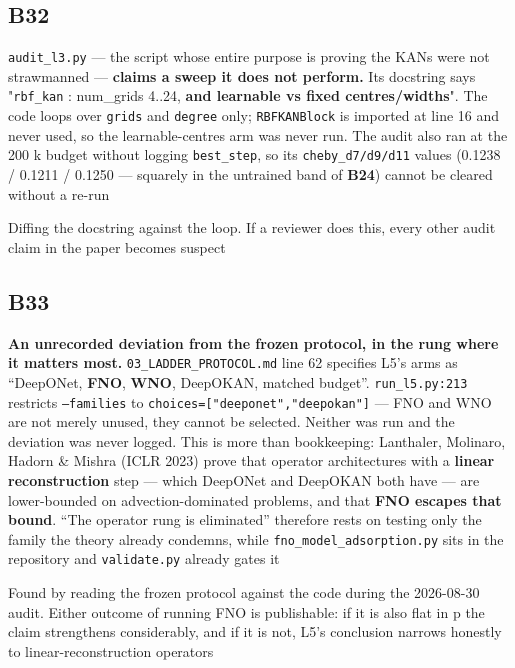 \documentclass[10pt]{article}
\begin{document}
\subsection*{B32}\label{led:B32}
\begin{description}[leftmargin=0pt,itemsep=1pt]
\item[Defect.] \texttt{audit\_l3.py} --- the script whose entire purpose is proving the KANs were not strawmanned --- \textbf{claims a sweep it does not perform.} Its docstring says "\texttt{rbf\_kan} : num\_grids 4..24, \textbf{and learnable vs fixed centres/widths}". The code loops over \texttt{grids} and \texttt{degree} only; \texttt{RBFKANBlock} is imported at line 16 and never used, so the learnable-centres arm was never run. The audit also ran at the 200 k budget without logging \texttt{best\_step}, so its \texttt{cheby\_d7/d9/d11} values (0.1238 / 0.1211 / 0.1250 --- squarely in the untrained band of \textbf{B24}) cannot be cleared without a re-run
\item[How it was caught.] Diffing the docstring against the loop. If a reviewer does this, every other audit claim in the paper becomes suspect
\end{description}
\subsection*{B33}\label{led:B33}
\begin{description}[leftmargin=0pt,itemsep=1pt]
\item[Defect.] \textbf{An unrecorded deviation from the frozen protocol, in the rung where it matters most.} \texttt{03\_LADDER\_PROTOCOL.md} line 62 specifies L5's arms as ``DeepONet, \textbf{FNO}, \textbf{WNO}, DeepOKAN, matched budget''. \texttt{run\_l5.py:213} restricts \texttt{--families} to \texttt{choices=["deeponet","deepokan"]} --- FNO and WNO are not merely unused, they cannot be selected. Neither was run and the deviation was never logged. This is more than bookkeeping: Lanthaler, Molinaro, Hadorn \& Mishra (ICLR 2023) prove that operator architectures with a \textbf{linear reconstruction} step --- which DeepONet and DeepOKAN both have --- are lower-bounded on advection-dominated problems, and that \textbf{FNO escapes that bound}. ``The operator rung is eliminated'' therefore rests on testing only the family the theory already condemns, while \texttt{fno\_model\_adsorption.py} sits in the repository and \texttt{validate.py} already gates it
\item[How it was caught.] Found by reading the frozen protocol against the code during the 2026-08-30 audit. Either outcome of running FNO is publishable: if it is also flat in p the claim strengthens considerably, and if it is not, L5's conclusion narrows honestly to linear-reconstruction operators
\end{description}
\end{document}
